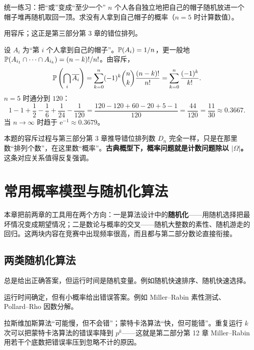 \begin{problem}{统一练习：把“或”变成“至少一个”}
$n$ 个人各自独立地把自己的帽子随机放进一个帽子堆再随机取回一顶。求没有人拿到自己帽子的概率（$n=5$ 时计算数值）。
\end{problem}
\hint 用容斥；这正是第三部分第 3 章的错位排列。

\sol 设 $A_i$ 为“第 $i$ 个人拿到自己的帽子”。$\mathbb P(A_i)=1/n$，更一般地 $\mathbb P(A_{i_1}\cap\cdots\cap A_{i_k})=(n-k)!/n!$。由容斥，
\[
\mathbb P\left(\bigcap_i\overline{A_i}\right)
=\sum_{k=0}^{n}(-1)^k\binom nk\frac{(n-k)!}{n!}
=\sum_{k=0}^{n}\frac{(-1)^k}{k!}.
\]
$n=5$ 时通分到 $120$：
\[
1-1+\frac12-\frac16+\frac1{24}-\frac1{120}
=\frac{120-120+60-20+5-1}{120}=\frac{44}{120}=\frac{11}{30}\approx0.3667.
\]
当 $n\to\infty$ 时趋于 $\mathrm e^{-1}\approx0.3679$。

\begin{teach}[概率与计数的接口]
本题的容斥过程与第三部分第 3 章推导错位排列数 $D_n$ 完全一样，只是在那里数“排列个数”，在这里数“概率”。\textbf{古典概型下，概率问题就是计数问题除以 $|\Omega|$。}这条对应关系值得反复强调。
\end{teach}

\chapter{常用概率模型与随机化算法}
\begin{chapterintro}[章节导读]
本章把前两章的工具用在两个方向：一是算法设计中的\textbf{随机化}——用随机选择把最坏情况变成期望情况；二是数论与概率的交叉——随机大整数的素性、随机游走的回归。这两块内容在竞赛中出现频率很高，而且都与第二部分数论直接衔接。
\end{chapterintro}

\section{两类随机化算法}
\begin{definition}[拉斯维加斯算法]
总是给出正确答案，但运行时间是随机变量。例如随机快速排序、随机快速选择。
\end{definition}
\begin{definition}[蒙特卡洛算法]
运行时间确定，但有小概率给出错误答案。例如 Miller--Rabin 素性测试、Pollard--Rho 因数分解。
\end{definition}

\begin{teach}[两类算法的区别要讲透]
拉斯维加斯算法“可能慢，但不会错”；蒙特卡洛算法“快，但可能错”。重复运行 $k$ 次可以把蒙特卡洛算法的错误率降到 $p^k$——这就是第二部分第 12 章 Miller--Rabin 用若干个底数把错误率压到忽略不计的原因。
\end{teach}

